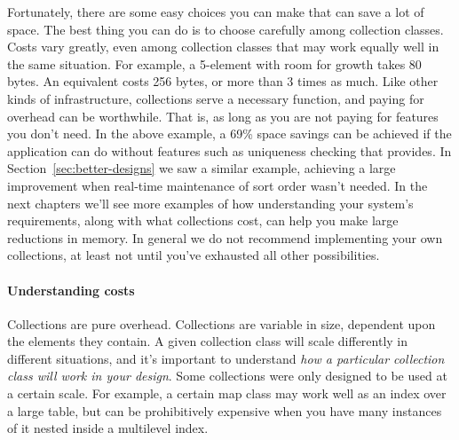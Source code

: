 



Fortunately, there are some easy choices you can make that
can save a lot of space. The best thing you can do is to choose carefully
among collection classes. Costs vary
greatly, even among collection classes that may work equally well
in the same situation. 
For example, a 5-element  with room for growth takes 80 bytes. 
An equivalent  costs 256 bytes,
or more than 3 times as much. Like other kinds of infrastructure, collections
serve a necessary function, and paying for overhead can be worthwhile. That is, as long as you are not
paying for features you don't need. In the above example, a
69\% space savings can be achieved if the application can do without features
such as uniqueness checking that
 provides. In Section~\ref{sec:better-designs} we saw a similar
example, achieving a large improvement when real-time
maintenance of sort order wasn't needed. In the next chapters we'll see more
examples of how understanding your system's requirements, along with what
collections cost, can help you make large reductions in memory. 
In general we do not recommend implementing your own collections, at least not
until you've exhausted all other possibilities.

\paragraph{Understanding costs} Collections are pure overhead. Collections are
variable in size, dependent upon the elements they contain. A given
collection class will scale differently in different situations, and it's
important to understand \emph{how a particular collection class
will work in your design}. Some collections were only designed
to be used at a certain scale.
For example, a certain map class may work
well as an index over a large table, but can be prohibitively expensive when you
have many instances of it nested inside a multilevel index. 

